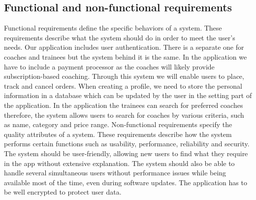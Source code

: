 \subsection{Functional and non-functional requirements}
\label{sec:Requirements}
Functional requirements define the specific behaviors of a system. These requirements describe what the system should do in order to meet the user’s needs. Our application includes user authentication. There is a separate one for coaches and trainees but the system behind it is the same. In the application we have to include a payment processor as the coaches will likely provide subscription-based coaching. Through this system we will enable users to place, track and cancel orders. When creating a profile, we need to store the personal information in a database which can be updated by the user in the setting part of the application. In the application the trainees can search for preferred coaches therefore, the system allows users to search for coaches by various criteria, such as name, category and price range.
Non-functional requirements specify the quality attributes of a system. These requirements describe how the system performs certain functions such as usability, performance, reliability and security. The system should be user-friendly, allowing new users to find what they require in the app without extensive explanation. The system should also be able to handle several simultaneous users without performance issues while being available most of the time, even during software updates. The application has to be well encrypted to protect user data. 
\clearpage
